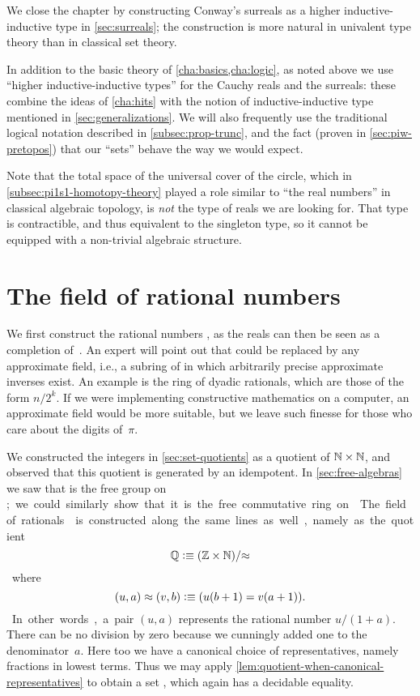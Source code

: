 We close the chapter by constructing Conway's surreals as a higher inductive-inductive type in \autoref{sec:surreals};
the construction is more natural in univalent type theory than in  classical set theory.

In addition to the basic theory of \autoref{cha:basics,cha:logic}, as noted above we use ``higher inductive-inductive types'' for the Cauchy reals and the surreals: these combine the ideas of \autoref{cha:hits} with the notion of inductive-inductive type mentioned in \autoref{sec:generalizations}.
We will also frequently use the traditional logical notation described in \autoref{subsec:prop-trunc}, and the fact (proven in \autoref{sec:piw-pretopos}) that our ``sets'' behave the way we would expect.

Note that the total space of the universal cover of the circle, which
in \autoref{subsec:pi1s1-homotopy-theory} played a role similar to ``the real numbers'' in
classical algebraic topology, is \emph{not} the type of reals we are looking for. That
type is contractible, and thus equivalent to the singleton type, so it cannot be equipped
with a non-trivial algebraic structure.



\section{The field of rational numbers}
\label{sec:field-rati-numb}

We first construct the rational numbers \Q, as the reals can then be seen as a completion
of~\Q. An expert will point out that \Q could be replaced by any approximate field, i.e.,
a subring of \Q in which arbitrarily precise approximate inverses exist. An example is the
ring of dyadic rationals, which are those of the form $n/2^k$. 
If we were implementing constructive mathematics on a computer,
an approximate field would be more suitable, but we leave such finesse for those
who care about the digits of~$\pi$.

We constructed the integers \Z in \autoref{sec:set-quotients} as a quotient of $\mathbb{N}\times
\mathbb{N}$, and observed that this quotient is generated by an idempotent. In
\autoref{sec:free-algebras} we saw that \Z is the free group on \unit; we could similarly
show that it is the free commutative ring on \emptyt. The field of rationals \Q is
constructed along the same lines as well, namely as the quotient
%
\[ \mathbb{Q} \vcentcolon\equiv (\mathbb{Z} \times \mathbb{N})/{\approx} \]
%
where
\[ (u,a) \approx (v,b) \vcentcolon\equiv (u (b + 1) = v (a + 1)). \]
%
In other words, a pair $(u, a)$ represents the rational number $u / (1 + a)$. There can be
no division by zero because we cunningly added one to the denominator~$a$. Here too we
have a canonical choice of representatives, namely fractions in lowest terms. Thus we may
apply \autoref{lem:quotient-when-canonical-representatives} to obtain a set \Q, which
again has a decidable equality.

